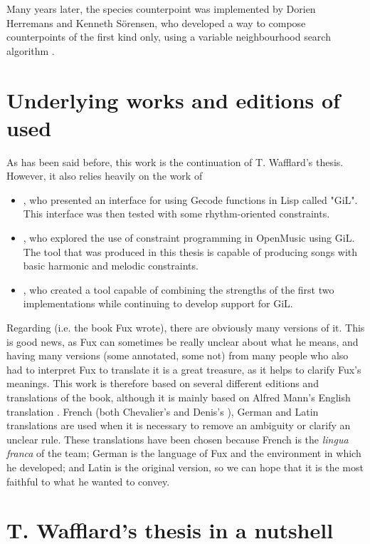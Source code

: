Many years later, the species counterpoint was implemented by Dorien Herremans and Kenneth Sörensen, who developed a way to compose counterpoints of the first kind only, using a variable neighbourhood search algorithm \cite{Herremans2012}.

\section{Underlying works and editions of \gaps used}
As has been said before, this work is the continuation of T. Wafflard's thesis. However, it also relies heavily on the work of
\begin{itemize}
    \item \textcite{GiLthesis}, who presented an interface for using Gecode functions in Lisp called "GiL". This interface was then tested with some rhythm-oriented constraints.
    \item \textcite{Melothesis}, who explored the use of constraint programming in OpenMusic using GiL. The tool that was produced in this thesis is capable of producing songs with basic harmonic and melodic constraints.
    \item \textcite{Melo2thesis}, who created a tool capable of combining the strengths of the first two implementations while continuing to develop support for GiL.
\end{itemize}

Regarding \gaps (i.e. the book Fux wrote), there are obviously many versions of it. This is good news, as Fux can sometimes be really unclear about what he means, and having many versions (some annotated, some not) from many people who also had to interpret Fux to translate it is a great treasure, as it helps to clarify Fux's meanings. This work is therefore based on several different editions and translations of the book, although it is mainly based on Alfred Mann's English translation \cite{GaPEng}. French (both Chevalier's \cite{GaPFrChevalier} and Denis's \cite{GaPFrDenis}), German \cite{GaPDe} and Latin \cite{GapLa} translations are used when it is necessary to remove an ambiguity or clarify an unclear rule. These translations have been chosen because French is the \textit{lingua franca} of the team; German is the language of Fux and the environment in which he developed; and Latin is the original version, so we can hope that it is the most faithful to what he wanted to convey.



\section{T. Wafflard's thesis in a nutshell}\label{section:thomas-in-a-nutshell}


